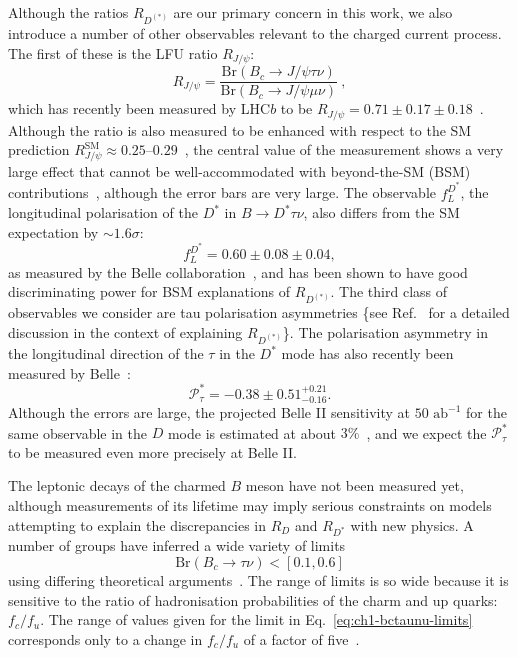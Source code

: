 Although the ratios $R_{D^{(*)}}$ are our primary concern in this work, we also
introduce a number of other observables relevant to the charged current process.
The first of these is the LFU ratio $R_{J/\psi}$:
\begin{equation}
  \label{eq:ch1-rjpsi}
  R_{J/\psi} = \frac{\mathrm{Br}(B_{c} \to J/\psi \tau \nu)}{\mathrm{Br}(B_{c} \to J/\psi \mu \nu)} \ ,
\end{equation}
which has recently been measured by LHC$b$ to be
$R_{J/\psi} = 0.71 \pm 0.17 \pm 0.18$~\cite{Aaij:2017tyk}. Although the ratio is
also measured to be enhanced with respect to the SM prediction
$R_{J/\psi}^{\text{SM}} \approx 0.25$--$0.29$~\cite{Anisimov:1998uk,
  Kiselev:2002vz, Ivanov:2006ni, Hernandez:2006gt, Huang:2007kb, Wang:2008xt,
  Issadykov:2018myx, Wen-Fei:2013uea, Alok:2017qsi, Azatov:2018knx, Hu:2019qcn,
  Leljak:2019eyw, Azizi:2019aaf}, the central value of the measurement shows a
very large effect that cannot be well-accommodated with beyond-the-SM (BSM)
contributions~\cite{Murgui:2019czp}, although the error bars are very large. The
observable $f_L^{D^*}$, the longitudinal polarisation of the $D^*$ in
$B \to D^* \tau \nu$, also differs from the SM expectation by $\sim 1.6 \sigma$:
\begin{equation}
  f_L^{D^*} = 0.60 \pm 0.08 \pm 0.04,
\end{equation}
as measured by the Belle collaboration~\cite{Abdesselam:2019wbt}, and has been
shown to have good discriminating power for BSM explanations of $R_{D^{(*)}}$.
The third class of observables we consider are tau polarisation asymmetries
\{see Ref.~\cite{Asadi:2018sym} for a detailed discussion in the context of
explaining $R_{D^{(*)}}$\}. The polarisation asymmetry in the longitudinal
direction of the $\tau$ in the $D^*$ mode has also recently been measured by
Belle~\cite{Hirose:2016wfn}:
\begin{equation}
  \mathcal{P}_{\tau}^{*} = -0.38 \pm 0.51^{+0.21}_{-0.16} .
\end{equation}
Although the errors are large, the projected Belle II sensitivity at
$50 \text{ ab}^{-1}$ for the same observable in the $D$ mode is estimated at
about $3\%$~\cite{Alonso:2017ktd}, and we expect the $\mathcal{P}_\tau^{*}$ to
be measured even more precisely at Belle II.

The leptonic decays of the charmed $B$ meson have not been measured yet,
although measurements of its lifetime may imply serious constraints on models
attempting to explain the discrepancies in $R_{D}$ and $R_{D^{*}}$ with new
physics. A number of groups have inferred a wide variety of limits
\begin{equation}
  \label{eq:ch1-bctaunu-limits}
  \mathrm{Br}(B_{c} \to \tau \nu) < [0.1, 0.6]
\end{equation}
using differing theoretical arguments~\cite{Li:2016vvp, Akeroyd:2017mhr,
  Alonso:2016oyd, Blanke:2018yud, Bardhan:2019ljo}. The range of limits is so
wide because it is sensitive to the ratio of hadronisation probabilities of the
charm and up quarks: $f_{c}/f_{u}$. The range of values given for the limit in
Eq.~\eqref{eq:ch1-bctaunu-limits} corresponds only to a change in $f_{c}/f_{u}$ of a
factor of five~\cite{Bardhan:2019ljo}.

